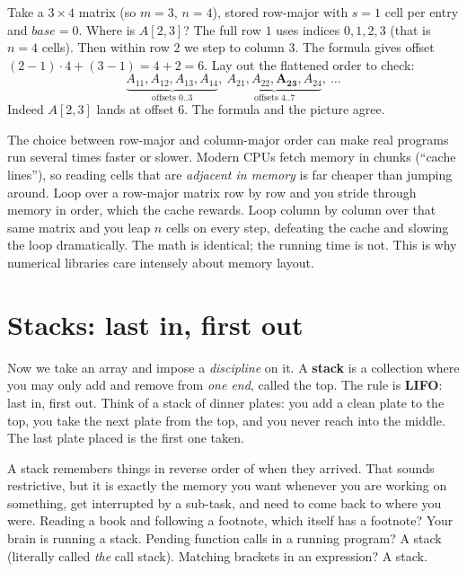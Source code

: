 \begin{example}
\label{ch10:ex-matrix}
Take a $3 \times 4$ matrix (so $m=3$, $n=4$), stored row-major with $s=1$ cell per entry and $base=0$. Where is $A[2,3]$? The full row $1$ uses indices $0,1,2,3$ (that is $n=4$ cells). Then within row $2$ we step to column $3$. The formula gives offset $(2-1)\cdot 4 + (3-1) = 4 + 2 = 6$. Lay out the flattened order to check:
\[
  \underbrace{A_{11},A_{12},A_{13},A_{14}}_{\text{offsets }0..3},\ \underbrace{A_{21},A_{22},\mathbf{A_{23}},A_{24}}_{\text{offsets }4..7},\ \dots
\]
Indeed $A[2,3]$ lands at offset $6$. The formula and the picture agree.
\end{example}

\begin{aestheticbox}
The choice between row-major and column-major order can make real programs run several times faster or slower. Modern CPUs fetch memory in chunks (``cache lines''), so reading cells that are \emph{adjacent in memory} is far cheaper than jumping around. Loop over a row-major matrix row by row and you stride through memory in order, which the cache rewards. Loop column by column over that same matrix and you leap $n$ cells on every step, defeating the cache and slowing the loop dramatically. The math is identical; the running time is not. This is why numerical libraries care intensely about memory layout.
\end{aestheticbox}

\section{Stacks: last in, first out}
\label{ch10:stack}

Now we take an array and impose a \emph{discipline} on it. A \textbf{stack} is a collection where you may only add and remove from \emph{one end}, called the top. The rule is \textbf{LIFO}: last in, first out. Think of a stack of dinner plates: you add a clean plate to the top, you take the next plate from the top, and you never reach into the middle. The last plate placed is the first one taken.

\begin{intuitionbox}
A stack remembers things in reverse order of when they arrived. That sounds restrictive, but it is exactly the memory you want whenever you are working on something, get interrupted by a sub-task, and need to come back to where you were. Reading a book and following a footnote, which itself has a footnote? Your brain is running a stack. Pending function calls in a running program? A stack (literally called \emph{the} call stack). Matching brackets in an expression? A stack.
\end{intuitionbox}

